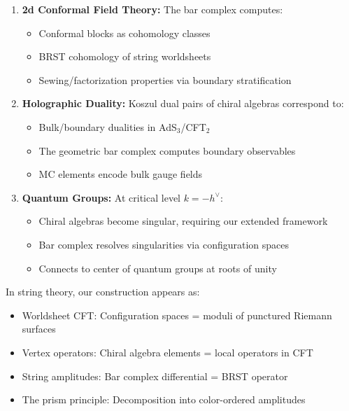 \begin{enumerate}
\item \textbf{2d Conformal Field Theory:} The bar complex computes:
\begin{itemize}
\item Conformal blocks as cohomology classes
\item BRST cohomology of string worldsheets
\item Sewing/factorization properties via boundary stratification
\end{itemize}

\item \textbf{Holographic Duality:} Koszul dual pairs of chiral algebras correspond to:
\begin{itemize}
\item Bulk/boundary dualities in AdS$_3$/CFT$_2$
\item The geometric bar complex computes boundary observables
\item MC elements encode bulk gauge fields
\end{itemize}

\item \textbf{Quantum Groups:} At critical level $k = -h^\vee$:
\begin{itemize}
\item Chiral algebras become singular, requiring our extended framework
\item Bar complex resolves singularities via configuration spaces
\item Connects to center of quantum groups at roots of unity
\end{itemize}
\end{enumerate}

\begin{remark}
In string theory, our construction appears as:
\begin{itemize}
\item Worldsheet CFT: Configuration spaces = moduli of punctured Riemann surfaces
\item Vertex operators: Chiral algebra elements = local operators in CFT
\item String amplitudes: Bar complex differential = BRST operator
\item The prism principle: Decomposition into color-ordered amplitudes
\end{itemize}
\end{remark}

